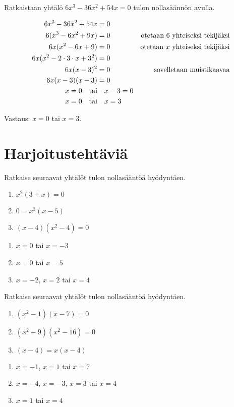 \begin{esimerkki}
Ratkaistaan yhtälö $6x^3-36x^2+54x=0$ tulon nollasäännön avulla.

\begin{align*}
6x^3-36x^2+54x &= 0 \\
6(x^3-6x^2+9x) &= 0 \ \ \ \ &\text{otetaan } 6 \text{ yhteiseksi tekijäksi} \\
6x(x^2-6x+9) &= 0 &\text{otetaan } x \text{ yhteiseksi tekijäksi} \\
6x(x^2-2\cdot 3\cdot x+3^2)  &= 0 \\
6x(x-3)^2 &= 0 &\text{sovelletaan muistikaavaa} \\
6x(x-3)(x-3) &= 0 \\
x=0 \textrm{\quad tai}& \quad x-3=0 \\
x=0 \textrm{\quad tai}& \quad x=3
\end{align*}

Vastaus: $x=0$ tai $x=3$.
\end{esimerkki}

\section{Harjoitustehtäviä}

\begin{tehtava}
    Ratkaise seuraavat yhtälöt tulon nollasääntöä hyödyntäen.
    \begin{enumerate}
        \item $x^2(3+x)=0$
        \item $0=x^3(x-5)$
        \item $(x-4)(x^2-4)=0$
    \end{enumerate}
    \begin{vastaus}
        \begin{enumerate}
            \item $x=0$ tai $x=-3$
            \item $x=0$ tai $x=5$
            \item $x=-2$, $x=2$ tai $x=4$
        \end{enumerate}
    \end{vastaus}
\end{tehtava}

\begin{tehtava}
    Ratkaise seuraavat yhtälöt tulon nollasääntöä hyödyntäen.
    \begin{enumerate}
        \item $(x^2-1)(x-7)=0$
        \item $(x^2-9)(x^2-16)=0$
        \item $(x-4)=x(x-4)$
    \end{enumerate}
    \begin{vastaus}
        \begin{enumerate}
            \item $x=-1$, $x=1$ tai $x=7$
            \item $x=-4$, $x=-3$, $x=3$ tai $x=4$
            \item $x=1$ tai $x=4$
        \end{enumerate}
    \end{vastaus}
\end{tehtava}

